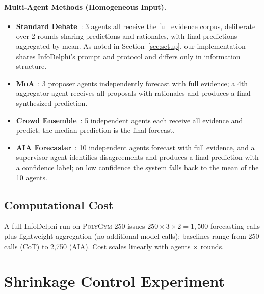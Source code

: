 \paragraph{ Multi-Agent Methods (Homogeneous Input).}
\begin{itemize}[nosep]
    \item \textbf{Standard Debate}~\citep{du2023improving}: 3 agents all receive the full evidence corpus, deliberate over 2 rounds sharing predictions and rationales, with final predictions aggregated by mean. As noted in Section~\ref{sec:setup}, our implementation shares InfoDelphi's prompt and protocol and differs only in information structure.
    \item \textbf{MoA}~\citep{wangmixture}: 3 proposer agents independently forecast with full evidence; a 4th aggregator agent receives all proposals with rationales and produces a final synthesized prediction.
    \item \textbf{Crowd Ensemble}~\citep{schoenegger2024wisdom}: 5 independent agents each receive all evidence and predict; the median prediction is the final forecast.
    \item \textbf{AIA Forecaster}~\citep{alur2025aia}: 10 independent agents forecast with full evidence, and a supervisor agent identifies disagreements and produces a final prediction with a confidence label; on low confidence the system falls back to the mean of the 10 agents.
\end{itemize}

\subsection{Computational Cost}
A full InfoDelphi run on \textsc{PolyGym}-250 issues $250 \times 3 \times 2 = 1{,}500$ forecasting calls plus lightweight aggregation (no additional model calls); baselines range from 250 calls (CoT) to 2{,}750 (AIA).
Cost scales linearly with agents $\times$ rounds.

\section{Shrinkage Control Experiment}
\label{sec:appendix_control}

